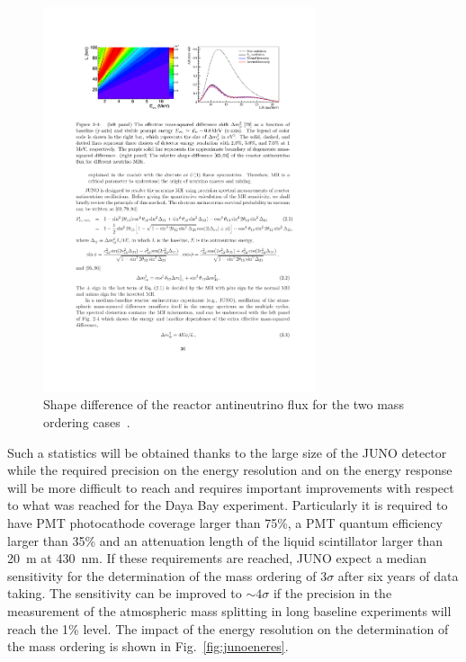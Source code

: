 \begin{figure} [h!]
\begin{center}
\includegraphics[width=8cm]{figures/JUNO_spectrum.pdf}
\caption{\label{fig:junospectrum} Shape difference of the reactor antineutrino flux for the two mass ordering cases~\cite{An:2015jdp}.}
\end{center}
\end{figure}

Such a statistics will be obtained thanks to the large size of the JUNO detector while the required precision on the energy resolution and on the energy response will be more difficult to reach and requires important improvements with respect to what was reached for the Daya Bay experiment. Particularly it is required to have PMT photocathode coverage larger than 75\%, a PMT quantum efficiency larger than 35\% and an attenuation length of the liquid scintillator larger than 20~m at 430~nm. If these requirements are reached, JUNO expect a median sensitivity for the determination of the mass ordering of $3\sigma$ after six years of data taking. The sensitivity can be improved to $\sim4\sigma$ if the precision in the measurement of the atmospheric mass splitting in long baseline experiments will reach the 1\% level.
The impact of the energy resolution on the determination of the mass ordering is shown in Fig.~\ref{fig:junoeneres}.

